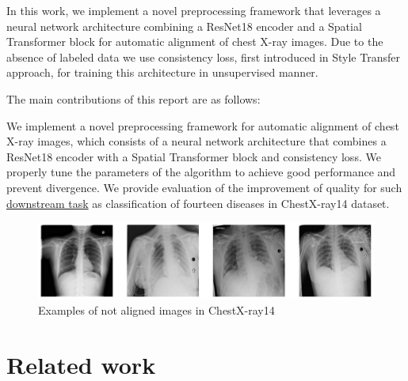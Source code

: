\documentclass{article}
\begin{document}
In this work, we implement a novel preprocessing framework that leverages a 
 neural network architecture combining a ResNet18 encoder and a Spatial 
 Transformer block for automatic alignment of chest X-ray images. Due to the 
 absence of labeled data we use consistency loss, first introduced in Style 
 Transfer approach, for training this architecture in unsupervised manner.

The main contributions of this report are as follows:

We implement a novel preprocessing framework for automatic alignment of chest
 X-ray images, which consists of a neural network architecture that combines 
 a ResNet18 encoder with a Spatial Transformer block and consistency loss. 
We properly tune the parameters of the algorithm to achieve good performance
 and prevent divergence.
We provide evaluation of the improvement of quality for such 
 \href{https://paperswithcode.com/sota/multi-label-classification-on-chestx-ray14}{downstream task}
 as classification of fourteen diseases in ChestX-ray14 dataset.

\begin{figure}[ht]\label{initial_images}
    \vskip 0.2in
    \begin{center}
    \centerline{\includegraphics[width=\columnwidth]{../images/initial_images.png}}
    \caption{Examples of not aligned images in ChestX-ray14}
    \end{center}
    \vskip -0.2in
\end{figure}

\section{Related work}\label{related_work}
\end{document}
